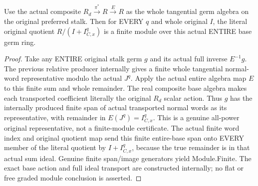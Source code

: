 \begin{theorem}
\label{hir:smooth-centre-entire-relative-base-quotients-finite}
\leanok
Use the actual composite $R_d\xrightarrow{\pi^*}R\xrightarrow E R$ as the
whole tangential germ algebra on the original preferred stalk. Then for EVERY
$q$ and whole original $I$, the literal original quotient $R/(I+I_{C,x}^q)$
is a finite module over this actual ENTIRE base germ ring.
\end{theorem}
\begin{proof}
Take any ENTIRE original stalk germ $g$ and its actual full inverse $E^{-1}g$.
The previous relative producer internally gives a finite whole tangential
normal-word representative modulo the actual $J^q$. Apply the actual entire
algebra map $E$ to this finite sum and whole remainder. The real composite
base algebra makes each transported coefficient literally the original
$R_d$ scalar action. Thus $g$ has the internally produced finite span of
actual transported normal words as its representative, with remainder in
$E(J^q)=I_{C,x}^q$. This is a genuine all-power original representative, not a
finite-module certificate. The actual finite word index and original quotient
map send this finite entire-base span onto EVERY member of the literal
quotient by $I+I_{C,x}^q$, because the true remainder is in that actual sum
ideal. Genuine finite span/image generators yield Module.Finite. The exact
base action and full ideal transport are constructed internally; no flat or
free graded module conclusion is asserted.
\end{proof}

